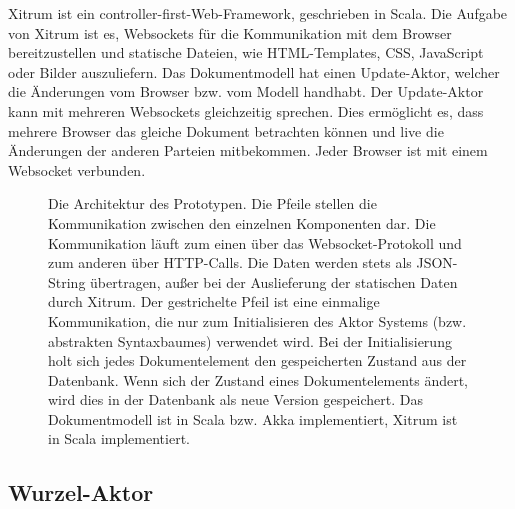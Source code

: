  
Xitrum ist ein controller-first-Web-Framework, geschrieben in Scala. Die Aufgabe von Xitrum ist es, Websockets für die Kommunikation mit dem Browser bereitzustellen und statische Dateien, wie HTML-Templates, CSS, JavaScript oder Bilder auszuliefern. Das Dokumentmodell hat einen Update-Aktor, welcher die Änderungen vom Browser bzw. vom Modell handhabt. Der Update-Aktor kann mit mehreren Websockets gleichzeitig sprechen. Dies ermöglicht es, dass mehrere Browser das gleiche Dokument betrachten können und live die Änderungen der anderen Parteien mitbekommen. Jeder Browser ist mit einem Websocket verbunden.

 
\begin{figure}[h!]
\centering
{}
\caption[Architektur des Prototypen]{ Die Architektur des Prototypen. Die Pfeile stellen die Kommunikation zwischen den einzelnen Komponenten dar. Die Kommunikation läuft zum einen über das Websocket-Protokoll und zum anderen über HTTP-Calls. Die Daten werden stets als JSON-String übertragen, außer bei der Auslieferung der statischen Daten durch Xitrum. Der gestrichelte Pfeil ist eine einmalige Kommunikation, die nur zum Initialisieren des Aktor Systems (bzw. abstrakten Syntaxbaumes) verwendet wird. Bei der Initialisierung holt sich jedes Dokumentelement den gespeicherten Zustand aus der Datenbank. Wenn sich der Zustand eines Dokumentelements ändert, wird dies in der Datenbank als neue Version gespeichert. Das Dokumentmodell ist in Scala bzw. Akka implementiert, Xitrum ist in Scala implementiert. }\label{architektur-fig}
\end{figure}
 
\subsection{Wurzel-Aktor}\label{}
 
